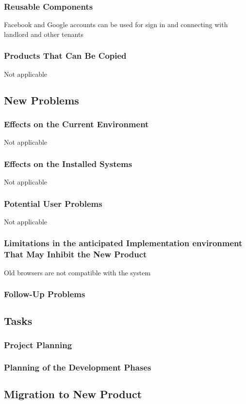 \documentclass[12pt, titlepage]{article}
\begin{document}
{\subsubsection{Reusable Components}
Facebook and Google accounts can be used for sign in and connecting with landlord and other tenants  
\subsubsection{Products That Can Be Copied}
Not applicable
\subsection{New Problems}
\subsubsection{Effects on the Current Environment}
Not applicable
\subsubsection{Effects on the Installed Systems}
Not applicable
\subsubsection{Potential User Problems}
Not applicable
\subsubsection{Limitations in the anticipated Implementation environment That May Inhibit the New Product}
Old browsers are not compatible with the system
\subsubsection{Follow-Up Problems}


\subsection{Tasks}
\subsubsection{Project Planning}
\subsubsection{Planning of the Development Phases}
\subsection{Migration to New Product}
}
\end{document}
